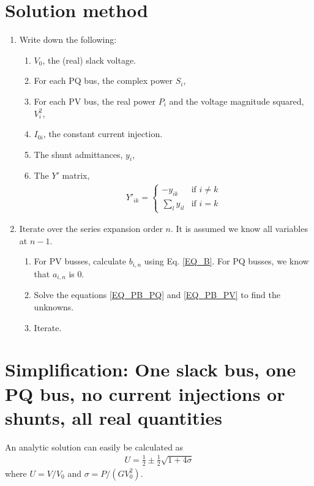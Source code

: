 \documentclass[11pt]{article}
\begin{document}
\section{Solution method}
\begin{enumerate}
	\item 
		Write down the following:
		\begin{enumerate}
			\item
				$V_0$, the (real) slack voltage.
			\item
				For each PQ bus, the complex power $S_i$,
			\item
				For each PV bus, the real power $P_i$ and the voltage magnitude squared, $V_i^2$,
			\item
				$I_{0i}$, the constant current injection.
			\item
				The shunt admittances, $y_i$,
			\item
				The $Y'$ matrix,
				\begin{align}
					Y'_{ik} = \begin{cases}
						-y_{ik}&\text{if $i \ne k$} \\
						\sum_l y_{il}& \text{if $i = k$}
					\end{cases}
					\label{EQ_YDASH_MATRIX}
				\end{align}
		\end{enumerate}
	\item 
		Iterate over the series expansion order $n$. It is assumed we know all variables at $n-1$.
		\begin{enumerate}
			\item
				For PV busses, calculate $b_{i,n}$ using Eq. \ref{EQ_B}. For PQ busses, we know that $a_{i,n}$ is 0.
			\item
				Solve the equations \ref{EQ_PB_PQ} and \ref{EQ_PB_PV} to find the unknowns.
			\item
				Iterate.
		\end{enumerate}
\end{enumerate}
\section{Simplification: One slack bus, one PQ bus, no current injections or shunts, all real quantities}
An analytic solution can easily be calculated as
\begin{align}
U = \frac{1}{2} \pm \frac{1}{2}\sqrt{1 + 4\sigma}
\end{align}
where $U = V/V_0$ and $\sigma = P/(GV_0^2)$.
\end{document}
